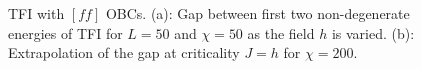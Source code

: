 	\begin{figure}[h!]
		\hspace{-0.9cm}
		\quad
		\caption{TFI with $[ff]$ OBCs. (a): Gap between first two non-degenerate energies of TFI for $L=50$ and $\chi=50$ as the field $h$ is varied. (b): Extrapolation of the gap at criticality $J=h$ for $\chi=200$.}
		\label{fig:gapsTFI}
	\end{figure}

